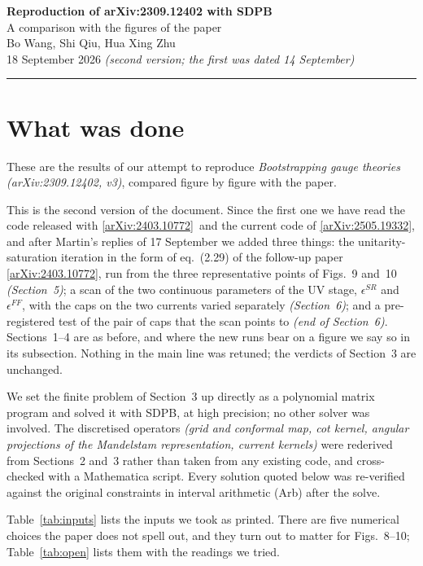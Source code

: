 \documentclass[11pt,a4paper]{article}
\newcommand{\note}[1]{{\color{quote}\itshape (#1)}}
\newcommand{\fup}{the follow-up paper \href{https://arxiv.org/abs/2403.10772}{[arXiv:2403.10772]}}
\newcommand{\fupc}{the code released with \href{https://arxiv.org/abs/2403.10772}{[arXiv:2403.10772]}}
\newcommand{\cur}{the current code of \href{https://arxiv.org/abs/2505.19332}{[arXiv:2505.19332]}}
\begin{document}
{\LARGE\bfseries Reproduction of arXiv:2309.12402 with SDPB}\\[4pt]
{\large A comparison with the figures of the paper}\\[8pt]
{Bo Wang, Shi Qiu, Hua Xing Zhu}\\[2pt]
{\color{quote}18 September 2026 \note{second version; the first was dated 14 September}}
\vspace{6pt}\hrule\vspace{8pt}

\section{What was done}
These are the results of our attempt to reproduce \emph{Bootstrapping gauge theories} \note{arXiv:2309.12402, v3}, compared figure by figure with the paper.

This is the second version of the document. Since the first one we have read \fupc\ and \cur, and after Martin's replies of 17 September we added three things: the unitarity-saturation iteration in the form of eq.~(2.29) of \fup, run from the three representative points of Figs.~9 and~10 \note{Section~5}; a scan of the two continuous parameters of the UV stage, $\epsilon^{SR}$ and $\epsilon^{FF}$, with the caps on the two currents varied separately \note{Section~6}; and a pre-registered test of the pair of caps that the scan points to \note{end of Section~6}. Sections~1--4 are as before, and where the new runs bear on a figure we say so in its subsection. Nothing in the main line was retuned; the verdicts of Section~3 are unchanged.

We set the finite problem of Section~3 up directly as a polynomial matrix program and solved it with SDPB, at high precision; no other solver was involved. The discretised operators \note{grid and conformal map, cot kernel, angular projections of the Mandelstam representation, current kernels} were rederived from Sections~2 and~3 rather than taken from any existing code, and cross-checked with a Mathematica script. Every solution quoted below was re-verified against the original constraints in interval arithmetic (Arb) after the solve.

Table~\ref{tab:inputs} lists the inputs we took as printed. There are five numerical choices the paper does not spell out, and they turn out to matter for Figs.~8--10; Table~\ref{tab:open} lists them with the readings we tried.
\end{document}
